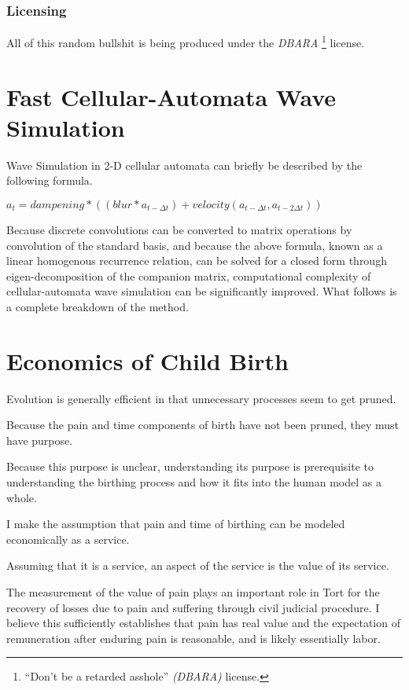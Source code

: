 \documentclass[11pt]{book}
\begin{document}
\subsection{Licensing}
\label{sec:DBARA}

All of this random bullshit is being produced under the \emph{DBARA}%
\footnote{``Don't be a retarded asshole'' \emph{(DBARA)} license.}
license.

\chapter{Fast Cellular-Automata Wave Simulation}

Wave Simulation in 2-D cellular automata can briefly be described by the following formula.

$\displaystyle a_{t} = dampening * ((blur * a_{t-{\Delta}t}) + velocity(a_{t-{\Delta}t},a_{t-2{\Delta}t})) $

Because discrete convolutions can be converted to matrix operations by convolution of the standard basis, and because the above formula, known as a linear homogenous recurrence relation, can be solved for a closed form through eigen-decomposition of the companion matrix, computational complexity of cellular-automata wave simulation can be significantly improved. What follows is a complete breakdown of the method.

\chapter{Economics of Child Birth}

Evolution is generally efficient in that unnecessary processes seem to get pruned.

Because the pain and time components of birth have not been pruned, they must have purpose.

Because this purpose is unclear, understanding its purpose is prerequisite to understanding the birthing process and how it fits into the human model as a whole.

I make the assumption that pain and time of birthing can be modeled economically as a service.

Assuming that it is a service, an aspect of the service is the value of its service.

The measurement of the value of pain plays an important role in Tort for the recovery of losses due to pain and suffering through civil judicial procedure. I believe this sufficiently establishes that pain has real value and the expectation of remuneration after enduring pain is reasonable, and is likely essentially labor.
\end{document}
